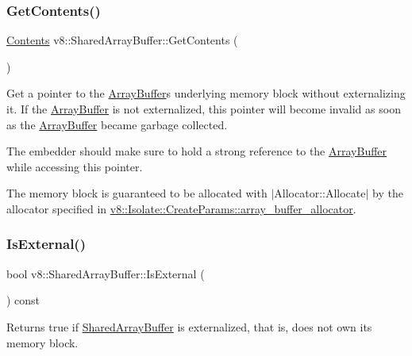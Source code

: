 \subsubsection{\texorpdfstring{Get\+Contents()}{GetContents()}}
{\footnotesize\ttfamily \mbox{\hyperlink{classv8_1_1SharedArrayBuffer_1_1Contents}{Contents}} v8\+::\+Shared\+Array\+Buffer\+::\+Get\+Contents (\begin{DoxyParamCaption}{ }\end{DoxyParamCaption})}

Get a pointer to the \mbox{\hyperlink{classv8_1_1ArrayBuffer}{Array\+Buffer}}\textquotesingle{}s underlying memory block without externalizing it. If the \mbox{\hyperlink{classv8_1_1ArrayBuffer}{Array\+Buffer}} is not externalized, this pointer will become invalid as soon as the \mbox{\hyperlink{classv8_1_1ArrayBuffer}{Array\+Buffer}} became garbage collected.

The embedder should make sure to hold a strong reference to the \mbox{\hyperlink{classv8_1_1ArrayBuffer}{Array\+Buffer}} while accessing this pointer.

The memory block is guaranteed to be allocated with $\vert$\+Allocator\+::\+Allocate$\vert$ by the allocator specified in \mbox{\hyperlink{structv8_1_1Isolate_1_1CreateParams_a7c663f70b64290392eeaf164f57585f9}{v8\+::\+Isolate\+::\+Create\+Params\+::array\+\_\+buffer\+\_\+allocator}}. \mbox{\label{classv8_1_1SharedArrayBuffer_adcbceac6432955c7d54fceea27c92b73}} 
\subsubsection{\texorpdfstring{Is\+External()}{IsExternal()}}
{\footnotesize\ttfamily bool v8\+::\+Shared\+Array\+Buffer\+::\+Is\+External (\begin{DoxyParamCaption}{ }\end{DoxyParamCaption}) const}

Returns true if \mbox{\hyperlink{classv8_1_1SharedArrayBuffer}{Shared\+Array\+Buffer}} is externalized, that is, does not own its memory block. \mbox{\label{classv8_1_1SharedArrayBuffer_a0e7060cc31105c5bf780d770c1a7acc6}} 
